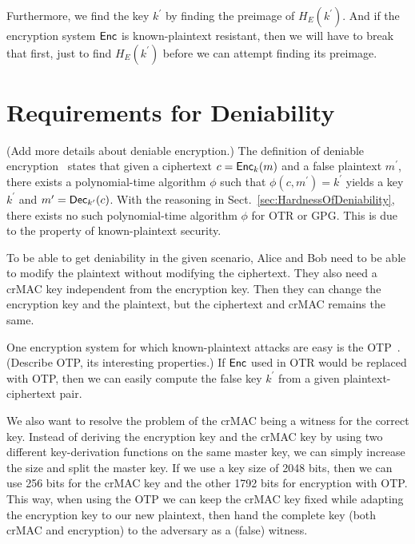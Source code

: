 Furthermore, we find the key \(k^\prime\) by finding the preimage of \(H_E( 
k^\prime )\).
And if the encryption system \(\operatorname{\mathsf{Enc}}\) is known-plaintext resistant, then we 
will have to break that first, just to find \(H_E( k^\prime )\) before we can 
attempt finding its preimage.


\section{Requirements for Deniability}
\label{sec:deniability}

(Add more details about deniable encryption.)
The definition of deniable encryption~\cite{deniablecrypt} states that given 
a ciphertext \(c = \operatorname{\mathsf{Enc}}_k( m )\) and a false plaintext \(m^\prime\), there 
exists a polynomial-time algorithm \(\phi\) such that \(\phi( c, m^\prime 
) = k^\prime\) yields a key \(k^\prime\) and \(m^\prime = \operatorname{\mathsf{Dec}}_{k^\prime}( 
c )\).
With the reasoning in Sect.~\ref{sec:HardnessOfDeniability}, there exists no 
such polynomial-time algorithm \(\phi\) for \ac{OTR} or \ac{GPG}.
This is due to the property of known-plaintext security.

To be able to get deniability in the given scenario, Alice and Bob need to be 
able to modify the plaintext without modifying the ciphertext.
They also need a \ac{crMAC} key independent from the encryption key.
Then they can change the encryption key and the plaintext, but the ciphertext 
and \ac{crMAC} remains the same.

One encryption system for which known-plaintext attacks are easy is the 
\ac{OTP}~\cite[cf.][Chap.~2]{Stinson2006cta}.
(Describe OTP, its interesting properties.)
If \(\operatorname{\mathsf{Enc}}\) used in \ac{OTR} would be replaced with \ac{OTP}, then we can 
easily compute the false key \(k^\prime\) from a given plaintext-ciphertext 
pair.

We also want to resolve the problem of the \ac{crMAC} being a witness for the 
correct key.
Instead of deriving the encryption key and the \ac{crMAC} key by using two 
different key-derivation functions on the same master key, we can simply 
increase the size and split the master key.
If we use a key size of 2048 bits, then we can use 256 bits for the \ac{crMAC} 
key and the other 1792 bits for encryption with \ac{OTP}.
This way, when using the \ac{OTP} we can keep the \ac{crMAC} key fixed while 
adapting the encryption key to our new plaintext, then hand the complete key 
(both \ac{crMAC} and encryption) to the adversary as a (false) witness.


